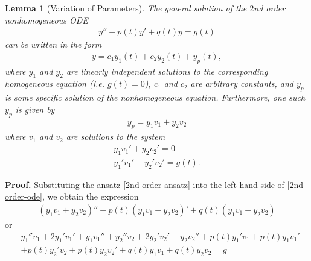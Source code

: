 \documentclass[12pt,reqno]{amsart}
\numberwithin{equation}{section}  %
\numberwithin{figure}{section}
\theoremstyle{plain}
\newtheorem{lemma}{Lemma}
\theoremstyle{definition}
\theoremstyle{remark}
\begin{document}
\begin{lemma}[Variation of Parameters]
\label{lem:nonhomog-ode-soln}
The general solution of the $2$nd order nonhomogeneous ODE 
%
%
\begin{equation}
  \label{2nd-order-ode}
\begin{split}
y'' + p(t)y' + q(t)y = g(t)
\end{split}
\end{equation}
%
%
can be written in the form
%
%
\begin{equation*}
\begin{split}
  y = c_{1}y_{1}(t) + c_{2}y_{2}(t) + y_{p}(t),
\end{split}
\end{equation*}
%
%
where $y_{1}$ and $y_{2}$ are linearly independent solutions to the
corresponding homogeneous equation (i.e. $g(t) = 0$), $c_{1}$ and $c_{2}$ are
arbitrary constants, and $y_{p}$ is some specific solution of the nonhomogeneous
equation. Furthermore, one such $y_{p}$ is given by
%
%
\begin{equation}
  \label{2nd-order-ansatz}
\begin{split}
  y_{p} = y_{1}v_{1} + y_{2} v_{2}
\end{split}
\end{equation}
%
%
where $v_{1}$ and $v_{2}$ are solutions to the system
\begin{gather}
  \label{cancel-rel-1}
  y_{1} v_{1}' + y_{2} v_{2}' = 0
  \\
  \label{cancel-rel-2}
  y_{1}' v_{1}' + y_{2}' v_{2}' = g(t).
\end{gather}
\end{lemma}
%
{\bf Proof.} Substituting the ansatz \eqref{2nd-order-ansatz} into
the left hand side of \eqref{2nd-order-ode}, we obtain the expression
%
%
%
%
\begin{equation*}
\begin{split}
  (y_{1}v_{1} + y_{2}v_{2})'' + p(t)(y_{1}v_{1} + y_{2}v_{2})' +
  q(t)(y_{1}v_{1} + y_{2}v_{2}) 
\end{split}
\end{equation*}
%
%
or
%
%
\begin{equation*}
  \begin{split}
    & y_{1}'' v_{1} + 2y_{1}'v_{1}' + y_{1}v_{1}'' + y_{2}''v_{2} + 2y_{2}' v_{2}'
  + y_{2} v_{2}'' + p(t)y_{1}'v_{1} + p(t)y_{1}v_{1}'
  \\
  & + p(t)y_{2}'v_{2} + p(t)y_{2}v_{2}' + q(t)y_{1}v_{1} + q(t)y_{2}v_{2} =g
\end{split}
\end{equation*}
\end{document}
